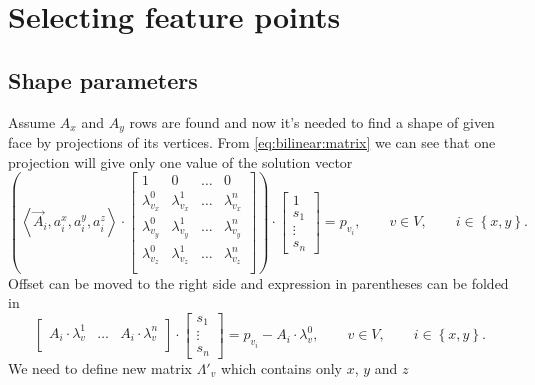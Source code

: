 \section{Selecting feature points}

\subsection{Shape parameters}

Assume $A_x$ and $A_y$ rows are found
and now it's needed to find a shape of given face
by projections of its vertices.
From \eqref{eq:bilinear:matrix} we can see that one projection
will give only one value of the solution vector
\begin{equation*}
  \left(
    \left\langle \vec{A}_i, a_i^x, a_i^y, a_i^z \right\rangle
    \cdot \begin{bmatrix}
      1               & 0               & \dots & 0 \\
      \lambda^0_{v_x} & \lambda^1_{v_x} & \dots & \lambda^n_{v_x} \\
      \lambda^0_{v_y} & \lambda^1_{v_y} & \dots & \lambda^n_{v_y} \\
      \lambda^0_{v_z} & \lambda^1_{v_z} & \dots & \lambda^n_{v_z} \\
    \end{bmatrix}
  \right)
  \cdot \begin{bmatrix}
    1 \\
    s_1 \\
    \vdots \\
    s_n
  \end{bmatrix}
  = p_{v_i},
  \qquad v \in V,
  \qquad i \in \left\{ x, y \right\}.
\end{equation*}
Offset can be moved to the right side and
expression in parentheses can be folded in
\begin{equation}\label{eq:linear:shape:first}
  \begin{bmatrix}
    A_i \cdot \lambda^1_v & \dots & A_i \cdot \lambda^n_v \\
  \end{bmatrix}
  \cdot \begin{bmatrix}
    s_1 \\
    \vdots \\
    s_n
  \end{bmatrix}
  = p_{v_i} - A_i \cdot \lambda^0_v,
  \qquad v \in V,
  \qquad i \in \left\{ x, y \right\}.
\end{equation}
We need to define new matrix $\Lambda'_v$ which contains only $x$, $y$ and $z$
